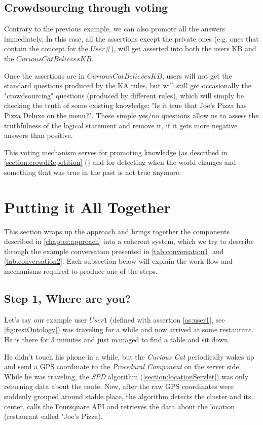 \subsection{Crowdsourcing through voting}
\label{section:crowdVoting}
Contrary to the previous example, we can also promote all the answers 
immediately. In this case, all the assertions except the private ones 
(e.g. ones that contain the concept for the $User\#$), will get asserted into 
both the users KB and the $CuriousCatBelievesKB$.

Once the assertions are in $CuriousCatBelievesKB$, users will not get the 
standard questions produced by the KA rules, but will still get occasionally 
the "crowdsourcing" questions (produced by different rules), which will 
simply be checking the truth of some existing knowledge: "Is it true that Joe's 
Pizza has Pizza Deluxe on the menu?". These simple yes/no questions allow us to 
assess the truthfulness of the logical statement and remove it, if it gets 
more negative answers than positive.

This voting mechanism serves for promoting knowledge (as described in 
\autoref{section:crowdRepetition} () and for 
detecting when the world changes and something that was true in the past is not 
true anymore.

\section{Putting it All Together}
\label{section:together}
This section wraps up the approach and brings together the components described
in \autoref{chapter:approach} into a coherent system, which we try to describe 
through the example conversation presented in \autoref{tab:conversation1} and
\autoref{tab:conversation2}. Each subsection below will explain the work-flow
and mechanisms required to produce one of the steps.

\subsection{Step 1, Where are you?}
\label{section:step1}
Let's say our example user $User1$ (defined with assertion \ref{as:user1}, see
\ref{fig:restOntology}) was traveling for a while
and now arrived at some restaurant. He is there for 3 minutes and just managed
to find a table and sit down.

He didn't touch his phone in a while, but the \emph{Curious Cat} periodically 
wakes up and send a GPS coordinate to the \emph{Procedural Component} on the
server side. While he was traveling, the \emph{SPD} algorithm 
(\autoref{section:locationServlet}) was only returning data about the route. 
Now, after the
raw GPS coordinates were suddenly grouped around stable place, the algorithm 
detects the cluster and its center, calls the Foursquare API and retrieves the 
data about the location (restaurant called "Joe's Pizza).

